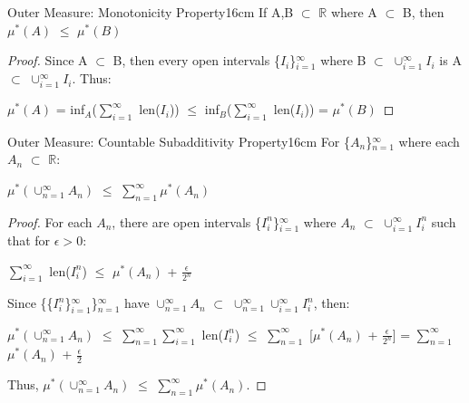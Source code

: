     \vspace{0.5cm}



    \begin{wtheorem}{Outer Measure: Monotonicity Property}{16cm}
        If A,B $\subset$ $\mathbb{R}$ where A $\subset$ B, then
        $\mu^*(A)$ $\leq$ $\mu^*(B)$
    \end{wtheorem}

    \begin{proof}
        Since A $\subset$ B, then every open intervals \{$I_i$\}$_{i=1}^{\infty}$
        where B $\subset$ $\cup_{i=1}^{\infty} I_i$
        is A $\subset$ $\cup_{i=1}^{\infty} I_i$. Thus:

        \hspace{0.5cm}
        $\mu^*(A)$
        = inf$_A$($\sum_{i=1}^{\infty}$ len($I_i$))
        $\leq$ inf$_B$($\sum_{i=1}^{\infty}$ len($I_i$))
        = $\mu^*(B)$
    \end{proof}

    \newpage



    \begin{wtheorem}{Outer Measure: Countable Subadditivity Property}{16cm}
        For \{$A_n$\}$_{n=1}^{\infty}$ where each $A_n$ $\subset$ $\mathbb{R}$:

        \hspace{0.5cm}
        $\mu^*(\cup_{n=1}^{\infty} A_n)$
        $\leq$ $\sum_{n=1}^{\infty} \mu^*(A_n)$
    \end{wtheorem}

    \begin{proof}
        For each $A_n$, there are open intervals \{$I_i^n$\}$_{i=1}^{\infty}$
        where $A_n$ $\subset$ $\cup_{i=1}^{\infty} I_i^n$ such that
        for $\epsilon > 0$:

        \hspace{0.5cm}
        $\sum_{i=1}^{\infty}$ len($I_i^n$)
        $\leq$ $\mu^*(A_n)$ + $\frac{\epsilon}{2^n}$

        Since \{\{$I_i^n$\}$_{i=1}^{\infty}$\}$_{n=1}^{\infty}$
        have $\cup_{n=1}^{\infty} A_n$
        $\subset$ $\cup_{n=1}^{\infty} \cup_{i=1}^{\infty} I_i^n$, then:

        \hspace{0.5cm}
        $\mu^*(\cup_{n=1}^{\infty} A_n)$
        $\leq$ $\sum_{n=1}^{\infty} \sum_{i=1}^{\infty}$ len($I_i^n$)
        $\leq$ $\sum_{n=1}^{\infty}$ [$\mu^*(A_n)$ + $\frac{\epsilon}{2^n}$]
        = $\sum_{n=1}^{\infty}$ $\mu^*(A_n)$ + $\frac{\epsilon}{2}$

        Thus, $\mu^*(\cup_{n=1}^{\infty} A_n)$
        $\leq$ $\sum_{n=1}^{\infty} \mu^*(A_n)$.
    \end{proof}

